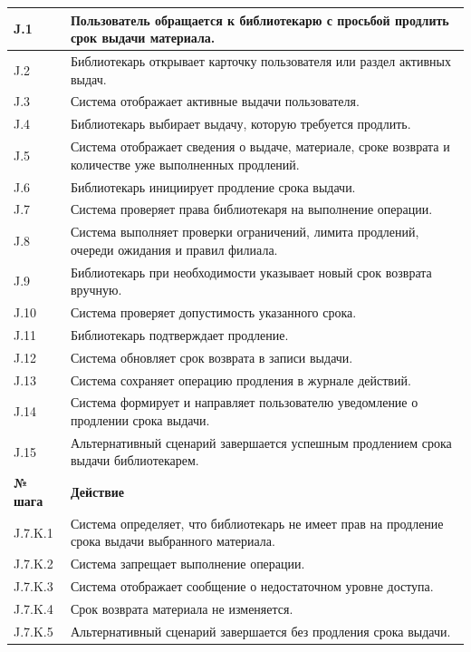 \documentclass[12pt,a4paper]{article}
\begin{document}
\begin{xltabular}{\textwidth}{
				|>{\raggedright\arraybackslash}p{2.7cm}
				|>{\raggedright\arraybackslash}X|
			}
			J.1 & Пользователь обращается к библиотекарю с просьбой продлить срок
			выдачи материала. \\
			\hline
			J.2 & Библиотекарь открывает карточку пользователя или раздел активных
			выдач. \\
			\hline
			J.3 & Система отображает активные выдачи пользователя. \\
			\hline
			J.4 & Библиотекарь выбирает выдачу, которую требуется продлить. \\
			\hline
			J.5 & Система отображает сведения о выдаче, материале, сроке возврата и
			количестве уже выполненных продлений. \\
			\hline
			J.6 & Библиотекарь инициирует продление срока выдачи. \\
			\hline
			J.7 & Система проверяет права библиотекаря на выполнение операции. \\
			\hline
			J.8 & Система выполняет проверки ограничений, лимита продлений, очереди
			ожидания и правил филиала. \\
			\hline
			J.9 & Библиотекарь при необходимости указывает новый срок возврата
			вручную. \\
			\hline
			J.10 & Система проверяет допустимость указанного срока. \\
			\hline
			J.11 & Библиотекарь подтверждает продление. \\
			\hline
			J.12 & Система обновляет срок возврата в записи выдачи. \\
			\hline
			J.13 & Система сохраняет операцию продления в журнале действий. \\
			\hline
			J.14 & Система формирует и направляет пользователю уведомление о
			продлении срока выдачи. \\
			\hline
			J.15 & Альтернативный сценарий завершается успешным продлением срока
			выдачи библиотекарем. \\
			\hline
			
			
			\textbf{№ шага} & \textbf{Действие} \\
			\hline
			
			J.7.K.1 & Система определяет, что библиотекарь не имеет прав на продление
			срока выдачи выбранного материала. \\
			\hline
			J.7.K.2 & Система запрещает выполнение операции. \\
			\hline
			J.7.K.3 & Система отображает сообщение о недостаточном уровне доступа. \\
			\hline
			J.7.K.4 & Срок возврата материала не изменяется. \\
			\hline
			J.7.K.5 & Альтернативный сценарий завершается без продления срока выдачи. \\
			\hline
			

\end{xltabular}
\end{document}
